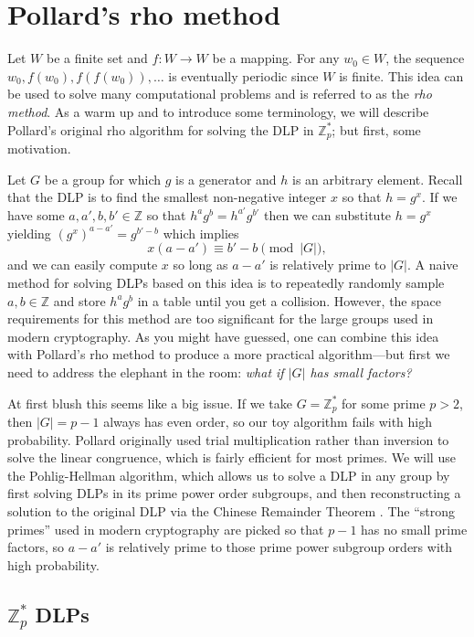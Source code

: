 \documentclass{article}
\newcommand{\ZZ}{\mathbb{Z}}
\begin{document}
\section{Pollard's rho method}

Let $W$ be a finite set and $f: W \to W$ be a mapping. For any $w_0 \in W$, the sequence $w_0, f(w_0), f(f(w_0)), \ldots$ is eventually periodic since $W$ is finite. This idea can be used to solve many computational problems and is referred to as the \textit{rho method}. As a warm up and to introduce some terminology, we will describe Pollard's original rho algorithm for solving the DLP in $\ZZ_p^*$; but first, some motivation.

Let $G$ be a group for which $g$ is a generator and $h$ is an arbitrary element. Recall that the DLP is to find the smallest non-negative integer $x$ so that $h=g^x$. If we have some $a,a',b,b' \in \ZZ$ so that $h^a g^b = h^{a'} g^{b'}$ then we can substitute $h=g^x$ yielding $(g^x)^{a-a'} = g^{b'-b}$ which implies $$x(a-a') \equiv b' - b \pmod{|G|},$$
and we can easily compute $x$ so long as $a-a'$ is relatively prime to $|G|$. A naive method for solving DLPs based on this idea is to repeatedly randomly sample $a,b \in \ZZ$ and store $h^a g^b$ in a table until you get a collision. However, the space requirements for this method are too significant for the large groups used in modern cryptography. As you might have guessed, one can combine this idea with Pollard's rho method to produce a more practical algorithm---but first we need to address the elephant in the room: \textit{what if $|G|$ has small factors?}

At first blush this seems like a big issue. If we take $G=\ZZ_p^*$ for some prime $p>2$, then $|G|=p-1$ always has even order, so our toy algorithm fails with high probability. Pollard originally used trial multiplication rather than inversion to solve the linear congruence, which is fairly efficient for most primes. We will use the Pohlig-Hellman algorithm, which allows us to solve a DLP in any group by first solving DLPs in its prime power order subgroups, and then reconstructing a solution to the original DLP via the Chinese Remainder Theorem \cite{Pohlig78}. The ``strong primes'' used in modern cryptography are picked so that $p-1$ has no small prime factors, so $a-a'$ is relatively prime to those prime power subgroup orders with high probability.

\subsection{$\ZZ_p^*$ DLPs}
\end{document}
